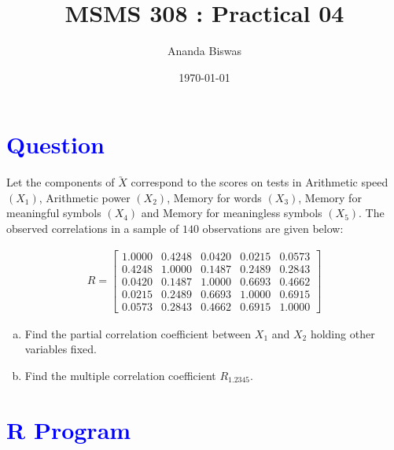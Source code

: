 \documentclass[11pt, a4paper]{article}\usepackage[]{graphicx}\usepackage[]{xcolor}
\title{MSMS 308 : Practical 04}
\author{Ananda Biswas}
\date{\today}
\begin{document}
\maketitle


\section*{\faArrowAltCircleRight[regular] \textcolor{blue}{Question}}

\hspace{1cm} Let the components of $\utilde{X}$ correspond to the scores on tests in Arithmetic speed $(X_1)$, Arithmetic power $(X_2)$, Memory for words $(X_3)$, Memory for meaningful symbols $(X_4)$ and Memory for meaningless symbols $(X_5)$. The observed correlations in a sample of $140$ observations are given below:

\begin{gather*}
R = 
\begin{bmatrix}
1.0000 & 0.4248 & 0.0420 & 0.0215 & 0.0573 \\
0.4248 & 1.0000 & 0.1487 & 0.2489 & 0.2843 \\
0.0420 & 0.1487 & 1.0000 & 0.6693 & 0.4662 \\
0.0215 & 0.2489 & 0.6693 & 1.0000 & 0.6915 \\
0.0573 & 0.2843 & 0.4662 & 0.6915 & 1.0000
\end{bmatrix}
\end{gather*}

\begin{enumerate}[(a)]
\item Find the partial correlation coefficient between $X_1$ and $X_2$ holding other variables fixed.

\item Find the multiple correlation coefficient $R_{1.2345}$.
\end{enumerate}

\section*{\faArrowAltCircleRight[regular] \textcolor{blue}{R Program}}
\end{document}
